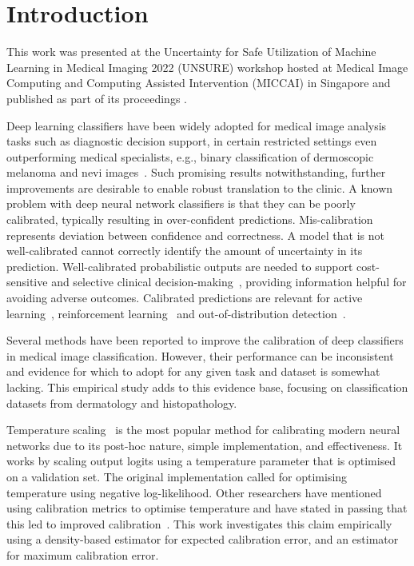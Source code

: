 \section{Introduction}
\label{sec:calibration_introduction}
This work was presented at the Uncertainty for Safe Utilization of Machine Learning in Medical Imaging 2022 (UNSURE) workshop hosted at Medical Image Computing and Computing Assisted Intervention (MICCAI) in Singapore and published as part of its proceedings \citep{carse2022calibration}.

Deep learning classifiers have been widely adopted for medical image analysis tasks such as diagnostic decision support, in certain restricted settings even outperforming medical specialists, e.g., binary classification of dermoscopic melanoma and nevi images~\citep{maron2019systematic}. Such promising results notwithstanding, further improvements are desirable to enable robust translation to the clinic. A known problem with deep neural network classifiers is that they can be poorly calibrated, typically resulting in over-confident predictions. Mis-calibration represents deviation between confidence and correctness. A model that is not well-calibrated cannot correctly identify the amount of uncertainty in its prediction. Well-calibrated probabilistic outputs are needed to support cost-sensitive and selective clinical decision-making~\citep{carse2021robust}, providing information helpful for avoiding adverse outcomes. Calibrated predictions are relevant for active learning~\citep{carse2019active}, reinforcement learning~\citep{dai2020federated} and out-of-distribution detection~\citep{ulmer2020trust}.

Several methods have been reported to improve the calibration of deep classifiers in medical image classification. However, their performance can be inconsistent and evidence for which to adopt for any given task and dataset is somewhat lacking. This empirical study adds to this evidence base, focusing on classification datasets from dermatology and histopathology. 

Temperature scaling~\citep{guo2017calibration} is the most popular method for calibrating modern neural networks due to its post-hoc nature, simple implementation, and effectiveness. It works by scaling output logits using a temperature parameter that is optimised on a validation set. The original implementation called for optimising temperature using negative log-likelihood. Other researchers have mentioned using calibration metrics to optimise temperature and have stated in passing that this led to improved calibration~\citep{mukhoti2020calibrating,frenkel2021network}. This work investigates this claim empirically using a density-based estimator for expected calibration error, and an estimator for maximum calibration error. 

